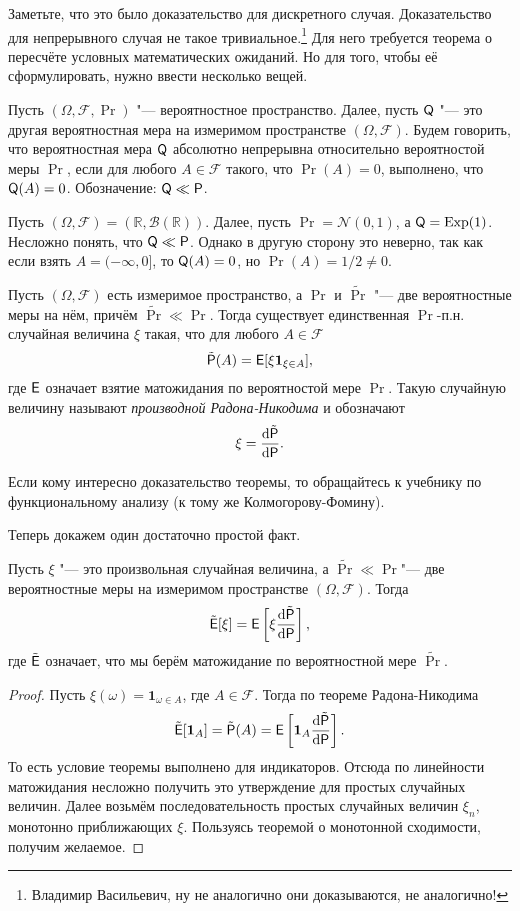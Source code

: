 Заметьте, что это было доказательство для дискретного случая. Доказательство для непрерывного случая не такое тривиальное.\footnote{Владимир Васильевич, ну не аналогично они доказываются, не аналогично!} Для него требуется теорема о пересчёте условных математических ожиданий. Но для того, чтобы её сформулировать, нужно ввести несколько вещей.
\begin{definition}
	Пусть $(\Omega, \mathcal{F}, \Pr)$ "--- вероятностное пространство. Далее, пусть $\mathsf{Q}$ "--- это другая вероятностная мера на измеримом пространстве $(\Omega, \mathcal{F})$. Будем говорить, что вероятностная мера $\mathsf{Q}$ абсолютно непрерывна относительно вероятностой меры $\Pr$, если для любого $A \in \mathcal{F}$ такого, что $\Pr(A) = 0$, выполнено, что $\mathsf{Q}(A) = 0$. Обозначение: $\mathsf{Q} \ll \mathsf{P}$.
\end{definition}
\begin{example}
	Пусть $(\Omega, \mathcal{F}) = (\mathbb{R}, \mathcal{B}(\mathbb{R}))$. Далее, пусть $\Pr = \mathcal{N}(0, 1)$, а $\mathsf{Q} = \mathrm{Exp}(1)$. Несложно понять, что $\mathsf{Q} \ll \mathsf{P}$. Однако в другую сторону это неверно, так как если взять $A = (-\infty, 0]$, то $\mathsf{Q}(A) = 0$, но $\Pr(A) = 1/2 \neq 0$.
\end{example}

\begin{theorem}
	Пусть $(\Omega, \mathcal{F})$ есть измеримое пространство, а $\Pr$ и $\tilde{\Pr}$ "--- две вероятностные меры на нём, причём $\tilde{\Pr} \ll \Pr$. Тогда существует единственная $\Pr$-п.н. случайная величина $\xi$ такая, что для любого $A \in \mathcal{F}$
	\[
		\tilde{\mathsf{P}}(A) = \operatorname{\mathsf{E}}[\xi\mathbf{1}_{\xi \in A}], 
	\]
	где $\operatorname{\mathsf{E}}$ означает взятие матожидания по вероятностой мере $\Pr$. Такую случайную величину называют \emph{производной Радона-Никодима} и обозначают
	\[
		\xi = \dv{\tilde{\mathsf{P}}}{\mathsf{P}}.
	\]
\end{theorem}
Если кому интересно доказательство теоремы, то обращайтесь к учебнику по функциональному анализу (к тому же Колмогорову-Фомину).

Теперь докажем один достаточно простой факт.
\begin{theorem}
	Пусть $\xi$ "--- это произвольная случайная величина, а $\tilde{\Pr} \ll \Pr$"--- две вероятностные меры на измеримом пространстве $(\Omega, \mathcal{F})$. Тогда
	\[
		\tilde{\operatorname{\mathsf{E}}}[\xi] = \operatorname{\mathsf{E}}\left[\xi\dv{\tilde{\mathsf{P}}}{\mathsf{P}}\right],
	\]
	где $\tilde{\operatorname{\mathsf{E}}}$ означает, что мы берём матожидание по вероятностной мере $\tilde{\Pr}$.
\end{theorem}
\begin{proof}
	Пусть $\xi(\omega) = \mathbf{1}_{\omega \in A}$, где $A \in \mathcal{F}$. Тогда по теореме Радона-Никодима
	\[
		\tilde{\operatorname{\mathsf{E}}}[\mathbf{1}_{A}] 
		= \tilde{\mathsf{P}}(A)
		= \operatorname{\mathsf{E}}\left[\mathbf{1}_{A}\dv{\tilde{\mathsf{P}}}{\mathsf{P}}\right].
	\]
	То есть условие теоремы выполнено для индикаторов. Отсюда по линейности матожидания несложно получить это утверждение для простых случайных величин. Далее возьмём последовательность простых случайных величин $\xi_{n}$, монотонно приближающих $\xi$. Пользуясь теоремой о монотонной сходимости, получим желаемое.
\end{proof}

